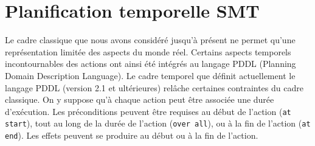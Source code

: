 














\section{Planification temporelle SMT}
%

Le cadre classique que nous avons considéré jusqu'à présent ne permet qu’une représentation limitée des aspects du monde réel. Certains aspects temporels incontournables des actions ont ainsi été intégrés au langage PDDL (Planning Domain Description Language). Le cadre temporel que définit actuellement le langage PDDL (version 2.1 et ultérieures) relâche certaines contraintes du cadre classique. On y suppose qu'à chaque action peut être associée une durée d'exécution. Les préconditions peuvent être requises au début de l'action (\texttt{at start}), tout au long de la durée de l'action (\texttt{over all}), ou à la fin de l'action (\texttt{at end}). Les effets peuvent se produire au début ou à la fin de l'action.


